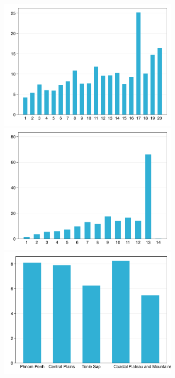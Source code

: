 \documentclass[11pt,letterpaper]{article}
\begin{document}
\begin{figure}[H]
\begin{subfigure}[b]{0.33\linewidth}
		\includegraphics[width=1\linewidth]{../../empirical/CSES2017/Appendix/Graphs/inc_educhead} 
		\vspace{-2.5em}
		\newline {}
		\includegraphics[width=1\linewidth]{../../empirical/CSES2017/Appendix/Graphs/inc_nmember} 
		\vspace{-2.5em}
		\newline {}
		\includegraphics[width=1\linewidth]{../../empirical/CSES2017/Appendix/Graphs/inc_region} 

\end{subfigure}
\end{figure}
\end{document}
